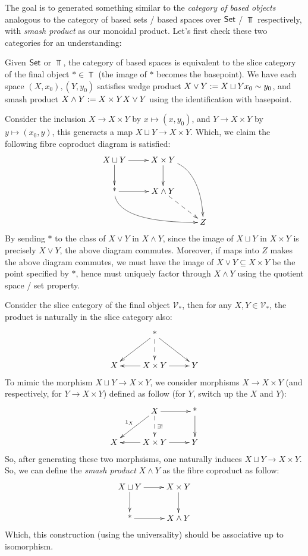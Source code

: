 \documentclass{article}
\begin{document}
The goal is to generated something similar to the \emph{category of based objects} analogous to the category of based sets / based spaces over $\mathsf{Set}$ / $\Top$ respectively, with \emph{smash product} as our monoidal product. Let's first check these two categories for an understanding:
\begin{exmp}
    Given $\mathsf{Set}$ or $\Top$, the category of based spaces is equivalent to the slice category of the final object $*\in\Top$ (the image of $*$ becomes the basepoint). We have each space $(X,x_0),(Y,y_0)$ satisfies wedge product $X\vee Y:= X\sqcup Y\/x_0\sim y_0$, and smash product $X\wedge Y:= X\times Y\/X\vee Y$ using the identification with basepoint. 
    
    Consider the inclusion $X \rightarrow X\times Y$ by $x\mapsto (x,y_0)$, and $Y\rightarrow X\times Y$ by $y\mapsto (x_0,y)$, this generaets a map $X\sqcup Y \rightarrow X\times Y$. Which, we claim the following fibre coproduct diagram is satisfied:
    \[\xymatrix{
        X\sqcup Y \ar[d] \ar[r] & X\times Y \ar[d] \ar@(r,u)[ddr]\\
        \text{*} \ar@(d,l)[drr] \ar[r] & X\wedge Y \ar@{-->}[dr]\\
        && Z
    }\]
    By sending $*$ to the class of $X\vee Y$ in $X\wedge Y$, since the image of $X\sqcup Y$ in $X\times Y$ is precisely $X\vee Y$, the above diagram commutes. Moreover, if maps into $Z$ makes the above diagram commutes, we must have the image of $X\vee Y\subseteq X\times Y$ be the point specified by $*$, hence must uniquely factor through $X\wedge Y$ using the quotient space / set property.
\end{exmp} 

\begin{con}
    Consider the slice category of the final object $\mathcal{V}_*$, then for any $X,Y\in\mathcal{V}_*$, the product is naturally in the slice category also:
    \[\xymatrix{
        & \text{*} \ar[dl] \ar[dr] \ar@{-->}[d]\\
        X & X\times Y \ar[l] \ar[r] & Y
    }\]
    To mimic the morphism $X\sqcup Y\rightarrow X\times Y$, we consider morphisms $X\rightarrow X\times Y$ (and respectively, for $Y\rightarrow X\times Y$) defined as follow (for $Y$, switch up the $X$ and $Y$):
    \[\xymatrix{
        & X \ar[r] \ar[dl]_-{1_X} \ar@{-->}[d]^-{\exists !} & \text{*} \ar[d]\\
        X & X\times Y \ar[l]\ar[r] & Y
    }\]
    So, after generating these two morphsisms, one naturally induces $X\sqcup Y \rightarrow X\times Y$. So, we can define the \emph{smash product} $X\wedge Y$ as the fibre coproduct as follow:
    \[\xymatrix{
        X\sqcup Y \ar[r] \ar[d] & X\times Y \ar[d]\\
        \text{*} \ar[r] & X\wedge Y
    }\]
    Which, this construction (using the universality) should be associative up to isomorphism.
\end{con}
\end{document}
